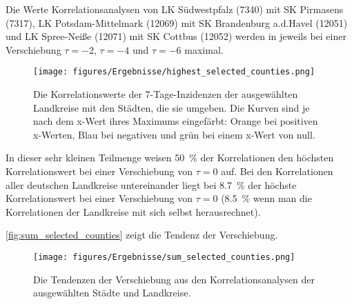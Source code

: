 Die Werte Korrelationsanalysen von LK Südwestpfalz (7340) mit SK Pirmasens (7317), LK Potsdam-Mittelmark (12069) mit SK Brandenburg a.d.Havel (12051) und LK Spree-Neiße (12071) mit SK Cottbus (12052) werden in jeweils bei einer Verschiebung $\tau=-2$, $\tau=-4$ und $\tau=-6$ maximal.
\begin{figure}[H]
    \centering
    \texttt{[image: figures/Ergebnisse/highest\_selected\_counties.png]}
    \caption{Die Korrelationswerte der 7-Tage-Inzidenzen der ausgewählten Landkreise mit den Städten, die sie umgeben. Die Kurven sind je nach dem x-Wert ihres Maximums eingefärbt: Orange bei positiven x-Werten, Blau bei negativen und grün bei einem x-Wert von null.}
    \label{fig:highest_selected_counties}
\end{figure}

In dieser sehr kleinen Teilmenge weisen 50~\% der Korrelationen den höchsten Korrelationswert bei einer Verschiebung von $\tau = 0$ auf.
Bei den Korrelationen aller deutschen Landkreise untereinander liegt bei 8.7~\% der höchste Korrelationswert bei einer Verschiebung von $\tau= 0$ (8.5~\% wenn man die Korrelationen der Landkreise mit sich selbst herausrechnet).

\autoref{fig:sum_selected_counties} zeigt die Tendenz der Verschiebung.
\begin{figure}
    \centering
    \texttt{[image: figures/Ergebnisse/sum\_selected\_counties.png]}
    \caption{Die Tendenzen der Verschiebung aus den Korrelationsanalysen der ausgewählten Städte und Landkreise.}
    \label{fig:sum_selected_counties}
\end{figure}